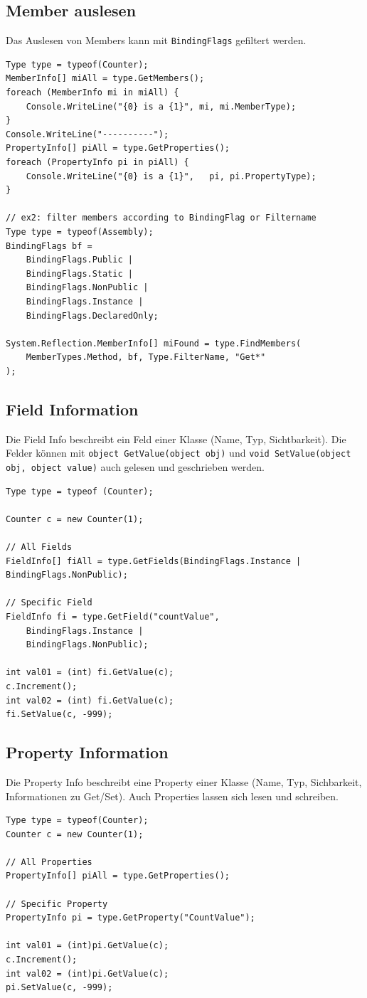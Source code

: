 \documentclass[
a4paper,
oneside,
10pt,
fleqn,
headsepline,
toc=listofnumbered, 
bibliography=totocnumbered]{scrartcl}
\begin{document}
\subsection{Member auslesen}
Das Auslesen von Members kann mit \lstinline|BindingFlags| gefiltert werden.
\begin{lstlisting}[caption=Reflection: Members auslesen]
Type type = typeof(Counter);
MemberInfo[] miAll = type.GetMembers();
foreach (MemberInfo mi in miAll) {
	Console.WriteLine("{0} is a {1}", mi, mi.MemberType);
}
Console.WriteLine("----------");
PropertyInfo[] piAll = type.GetProperties();
foreach (PropertyInfo pi in piAll) {
	Console.WriteLine("{0} is a {1}",	pi, pi.PropertyType);
}

// ex2: filter members according to BindingFlag or Filtername
Type type = typeof(Assembly);
BindingFlags bf =
	BindingFlags.Public |
	BindingFlags.Static |
	BindingFlags.NonPublic |
	BindingFlags.Instance |
	BindingFlags.DeclaredOnly;

System.Reflection.MemberInfo[] miFound = type.FindMembers(
	MemberTypes.Method, bf, Type.FilterName, "Get*"
);
\end{lstlisting}

\subsection{Field Information}
Die Field Info beschreibt ein Feld einer Klasse (Name, Typ, Sichtbarkeit). Die Felder können mit \lstinline|object GetValue(object obj)| und \lstinline|void SetValue(object obj, object value)| auch gelesen und geschrieben werden.

\begin{lstlisting}[caption=Reflection: Field Info]
Type type = typeof (Counter);

Counter c = new Counter(1);

// All Fields
FieldInfo[] fiAll = type.GetFields(BindingFlags.Instance | BindingFlags.NonPublic);
	
// Specific Field
FieldInfo fi = type.GetField("countValue", 
	BindingFlags.Instance | 
	BindingFlags.NonPublic);
	
int val01 = (int) fi.GetValue(c);
c.Increment();
int val02 = (int) fi.GetValue(c);
fi.SetValue(c, -999);
\end{lstlisting}

\subsection{Property Information}
Die Property Info beschreibt eine Property einer Klasse (Name, Typ, Sichbarkeit, Informationen zu Get/Set). Auch Properties lassen sich lesen und schreiben.
\begin{lstlisting}[caption=Reflection: Property Info]
Type type = typeof(Counter);
Counter c = new Counter(1);

// All Properties
PropertyInfo[] piAll = type.GetProperties();

// Specific Property
PropertyInfo pi = type.GetProperty("CountValue");

int val01 = (int)pi.GetValue(c);
c.Increment();
int val02 = (int)pi.GetValue(c);
pi.SetValue(c, -999);
\end{lstlisting}
\end{document}
